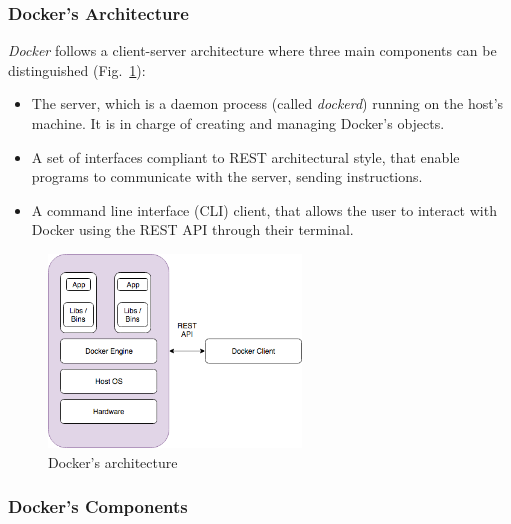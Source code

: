 \documentclass[a4paper,12pt]{article}
\def\myfig#1{Fig.~#1\xspace}
\begin{document}
\subsubsection{Docker's Architecture}

\textit{Docker} follows a client-server architecture where three main components
can be distinguished \cite{docker_architecture}
(\myfig{\ref{fig:docker-architecture}}):
\begin{itemize}
  \item The server, which is a daemon process (called \textit{dockerd}) running
  on the host's machine. It is in charge of creating and managing Docker's objects.
  \item A set of interfaces compliant to REST architectural style, that enable
  programs to communicate with the server, sending instructions.
  \item A command line interface (CLI) client, that allows the user to interact
  with Docker using the REST API through their terminal. 
\end{itemize}   

\begin{figure}[ht!]
  \centerline{\includegraphics[width=0.6\textwidth]{docker_architecture.png}}
  \caption{Docker's architecture}
  \label{fig:docker-architecture}
  \end{figure}

\subsubsection{Docker's Components}
\label{sec:docker_object}
\end{document}
